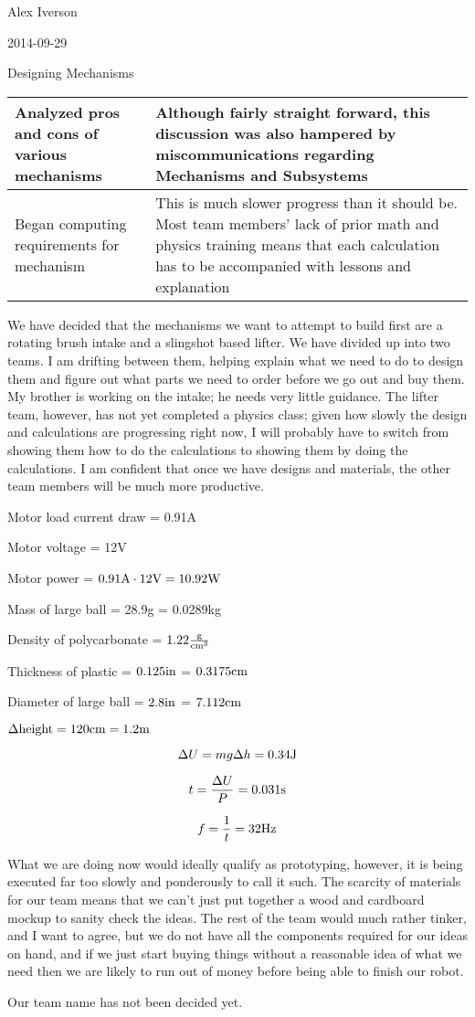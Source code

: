 Alex Iverson

2014-09-29

Designing Mechanisms

\begin{tabular}{|p{5cm}|p{5cm}|}
 \hline
 Analyzed pros and cons of various mechanisms
 &
 Although fairly straight forward, this discussion was also hampered by miscommunications regarding Mechanisms and Subsystems
 \\
 \hline
 Began computing requirements for mechanism
 &
 This is much slower progress than it should be. Most team members’  lack of prior math and physics training means that each calculation has to be accompanied with lessons and explanation
 \\
 \hline
\end{tabular}

We have decided that the mechanisms we want to attempt to build first are a rotating brush intake and a slingshot based lifter. We have divided up into two teams. I am drifting between them, helping explain what we need to do to design them and figure out what parts we need to order before we go out and buy them. My brother is working on the intake; he needs very little guidance. The lifter team, however, has not yet completed a physics class; given how slowly the design and calculations are progressing right now, I will probably have to switch from showing them how to do the calculations to showing them by doing the calculations. I am confident that once we have designs and materials, the other team members will be much more productive. 

Motor load current draw = 0.91A

Motor voltage = 12V

Motor power = $0.91\rm{A}\cdot12\rm{V} = 10.92\rm{W}$

Mass of large ball = 28.9g = 0.0289kg

Density of polycarbonate = $1.22\frac{\rm{g}}{\rm{cm}^3}$

Thickness of plastic = $0.125\rm{in}$ = $0.3175\rm{cm}$

Diameter of large ball = $2.8\rm{in}$ = $7.112\rm{cm}$

$\Delta \rm{height} = 120\rm{cm} = 1.2\rm{m}$

\[\Delta U = m g \Delta h = 0.34\rm{J}\]

\[t = \frac{\Delta U}{P} = 0.031\rm{s}\]

\[f = \frac{1}{t} = 32\rm{Hz}\]

\medskip

What we are doing now would ideally qualify as prototyping, however, it is being executed far too slowly and ponderously to call it such. The scarcity of materials for our team means that we can’t just put together a wood and cardboard mockup to sanity check the ideas. The rest of the team would much rather tinker, and I want to agree, but we do not have all the components required for our ideas on hand, and if we just start buying things without a reasonable idea of what we need then we are likely to run out of money before being able to finish our robot.

Our team name has not been decided yet.
